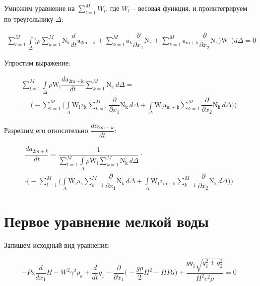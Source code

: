 \documentclass[14pt]{extreport}
\begin{document}
Умножим уравнение на $\sum\limits_{l=1}^{M} W_l$, где $W_l$ -- весовая функция, и проинтегрируем по треугольнику $\Delta$:

\begin{multline*}
\sum_{l=1}^{M} \int\limits_{\Delta} \bigg(\rho \sum_{k=1}^{M} \operatorname{N_{k}} \dfrac{d}{d t} \operatorname{a_{2m+k}} + \sum_{k=1}^{M} \operatorname{a_{k}} \dfrac{\partial}{\partial x_{1}} \operatorname{N_{k}} + \sum_{k=1}^{M} \operatorname{a_{m+k}} \dfrac{\partial}{\partial x_{2}} \operatorname{N_{k}}\bigg) \operatorname{W_{l}}\, \bigg)d\Delta=0
\end{multline*}

Упростим выражение:

\begin{multline*}
\sum_{l=1}^{M} \int\limits_{\Delta} \rho \operatorname{W_{l}} \dfrac{d\operatorname{a_{2m+k}}}{d t} \sum_{k=1}^{M} \operatorname{N_{k}}\, d\Delta = \\ =\bigg ( - \sum_{l=1}^{M} \bigg(\int\limits_{\Delta} \operatorname{W_{l}} \operatorname{a_{k}} \sum_{k=1}^{M} \dfrac{\partial}{\partial x_{1}} \operatorname{N_{k}}\, d\Delta + \int\limits_{\Delta} \operatorname{W_{l}} \operatorname{a_{m+k}} \sum_{k=1}^{M} \dfrac{\partial}{\partial x_{2}} \operatorname{N_{k}}\, d\Delta\bigg)\bigg )
\end{multline*}

Разрешим его относительно $\dfrac{da_{2m+k}}{dt}$:

\begin{multline*}
\dfrac{da_{2m+k}}{dt}= \dfrac{1}{\sum\limits_{l=1}^{M} \int\limits_{\Delta} \rho \operatorname{W_{l}}  \sum\limits_{k=1}^{M} \operatorname{N_{k}}\, d\Delta} \cdot \\ \cdot \bigg ( - \sum_{l=1}^{M} \bigg(\int\limits_{\Delta} \operatorname{W_{l}} \operatorname{a_{k}} \sum\limits_{k=1}^{M} \dfrac{\partial}{\partial x_{1}} \operatorname{N_{k}}\, d\Delta + \int\limits_{\Delta} \operatorname{W_{l}} \operatorname{a_{m+k}} \sum_{k=1}^{M} \dfrac{\partial}{\partial x_{2}} \operatorname{N_{k}}\, d\Delta\bigg)\bigg )
\end{multline*}


\section{Первое уравнение мелкой воды}

Запишем исходный вид уравнения:

\begin{multline*}
- Pa \dfrac{d}{d x_{1}} H - W^{2} \gamma^{2} \rho_{a} + \dfrac{d}{d t} q_{1} - \dfrac{\partial}{\partial x_{1}}\bigg(- \dfrac{g \rho}{2} H^{2} - H Pa\bigg) + \dfrac{g q_{1} \sqrt{q_{1}^{2} + q_{2}^{2}}}{H^{2} c^{2} \rho}=0
\end{multline*}
\end{document}
